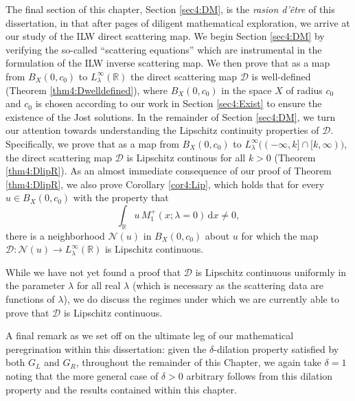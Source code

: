 \documentclass[../dissertation.tex]{subfiles}
\begin{document}
The final section of this chapter, Section \ref{sec4:DM}, is the 
\textit{rasion d'\^etre} of this dissertation, in that after 
\pageref{lastpagePenultimateSection} pages of diligent mathematical exploration, 
we arrive at our study of the ILW direct scattering map. We begin Section 
\ref{sec4:DM} by verifying the so-called ``scattering equations'' which are
instrumental in the formulation of the ILW inverse scattering map. We then prove 
that as a map from $B_X(0, c_0)$ to $L_\lambda^\infty(\mathbb R)$ the direct 
scattering map $\mathscr D$ is well-defined (Theorem \ref{thm4:Dwelldefined}), 
where  $B_X(0, c_0)$ in the space $X$ of radius $c_0$ and $c_0$ is chosen 
according to our work in Section \ref{sec4:Exist} to ensure the existence of the
Jost solutions. In the remainder of Section \ref{sec4:DM}, we turn our attention
towards understanding the Lipschitz continuity properties of $\mathscr D$. Specifically,
we prove that as a map from $B_X(0, c_0)$ to 
$L_\lambda^\infty\big((-\infty,k]\cap[k, \infty) \big)$, the direct scattering map 
$\mathscr D$ is Lipschitz continous for all $k>0$ (Theorem \ref{thm4:DlipR}). As
an almost immediate consequence of our proof of Theorem \ref{thm4:DlipR}, we 
also prove Corollary \ref{cor4:Lip}, which holds that for every 
$u \in B_X(0,c_0)$ with the property that 
\[
	\int_{\mathbb R} u \, M_1^+(x; \lambda = 0) \, \mathrm{d}x \ne 0,
\]
there is a neighborhood $\mathcal N(u)$ in $B_X(0, c_0)$ about $u$ for which 
the map $\mathscr D: \mathcal N(u) \to L^\infty_\lambda(\mathbb R)$ is 
Lipschitz continuous. 




While we have not yet found a proof that $\mathscr D$ is Lipschitz continuous 
uniformly in the parameter $\lambda$ for all real $\lambda$ (which is necessary 
as the scattering data are functions of $\lambda$), we do discuss the regimes 
under which we are currently able to prove that $\mathscr D$ is Lipschitz 
continuous. 

A final remark as we set of{}f on the ultimate leg of our mathematical 
peregrination within this dissertation: 
given the $\delta$-dilation property satisfied by both $G_L$ and $G_R$, throughout 
the remainder of this Chapter, we again take $\delta = 1$ noting that the more general 
case of $\delta>0$ arbitrary follows from this dilation property and the results
contained within this chapter. 
\end{document}
